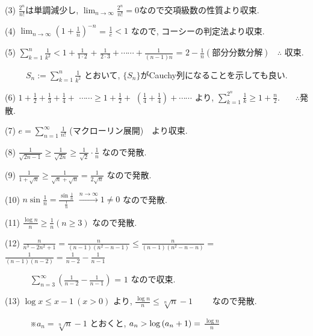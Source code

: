 \documentclass{jsarticle}
\begin{document}
(3) $\displaystyle \frac{2^n}{n!}$は単調減少し, 
    $\displaystyle \lim_{n \to \infty} \frac{2^n}{n!} = 0$なので交項級数の性質より収束.
    
(4) $\displaystyle \lim_{n \to \infty} \left(1+\frac{1}{n} \right)^{-n}$ = 
$\displaystyle \frac{1}{e} < 1$ なので, コーシーの判定法より収束.

(5) $\displaystyle \sum_{k=1}^{n} \frac{1}{k^2} < 1+ \displaystyle \frac{1}{1\cdot2}$
+ $\displaystyle \frac{1}{2\cdot3} + \dotsb\dotsb + \displaystyle \frac{1}{(n-1)n}$ = 
$2 - \displaystyle \frac{1}{n}(部分分数分解) \ \ \ \  \therefore$ 収束.

 \ \ \ \ \ $S_n := \displaystyle \sum_{k=1}^{n} \frac{1}{k^2}$ とおいて, $\{S_n\}$がCauchy列になることを示しても良い.

(6) $1+\displaystyle \frac{1}{2} + \displaystyle \frac{1}{3} + \displaystyle \frac{1}{4} + $
$ \dotsb\dotsb  \ge 1 + \displaystyle \frac{1}{2} + $
$\left(\displaystyle \frac{1}{4} + \displaystyle \frac{1}{4} \right) + \dotsb\dotsb$ より,
$\displaystyle \sum_{k=1}^{2^n} \frac{1}{k} \ge 1 + \displaystyle \frac{n}{2}$. \ \ \ $\therefore$発散.

(7) $e = \displaystyle \sum_{n=1}^{\infty} \frac{1}{n!}$ (マクローリン展開)　より収束.

(8) $\displaystyle \frac{1}{\sqrt{2n-1}} \ge \frac{1}{\sqrt{2n}} \ge \frac{1}{\sqrt{2}}\cdot\frac{1}{n}$ なので発散.

(9) $\displaystyle \frac{1}{1+\sqrt{n}} \ge \frac{1}{\sqrt{n} + \sqrt{n}} = \frac{1}{2\sqrt{n}}$
    なので発散.
    
(10) $n\sin \displaystyle \frac{1}{n} = \frac{\sin \frac{1}{n}}{\frac{1}{n}}$
     $\stackrel{n \to \infty}{\longrightarrow} 1 \neq 0$ なので発散.
     
(11) $\displaystyle \frac{\log n}{n} \ge \frac{1}{n} (n \ge 3)$ なので発散.

(12) $\displaystyle \frac{n}{n^3-2n^2+1} = \frac{n}{(n-1)(n^2-n-1)} \le \frac{n}{(n-1)(n^2-n-n)}$ 
     = $\displaystyle \frac{1}{(n-1)(n-2)} = \frac{1}{n-2} - \frac{1}{n-1}$
     
     \ \ \ \ \ \ $\displaystyle \sum_{n=3}^{\infty} \left(\frac{1}{n-2} - \frac{1}{n-1} \right)$      = $1$ なので収束.
     
(13) $\log x \le x - 1 \ (x > 0)$ より, $\displaystyle \frac{\log n}{n} \le \sqrt[n]{n} - 1$ 
　　なので発散.

    \ \ \ \ \ \ ※$a_n = \sqrt[n]{n} - 1$ とおくと, $a_n > \log{(a_n + 1)} = \displaystyle$           $\displaystyle \frac{\log n}{n}$
    
\end{document}
